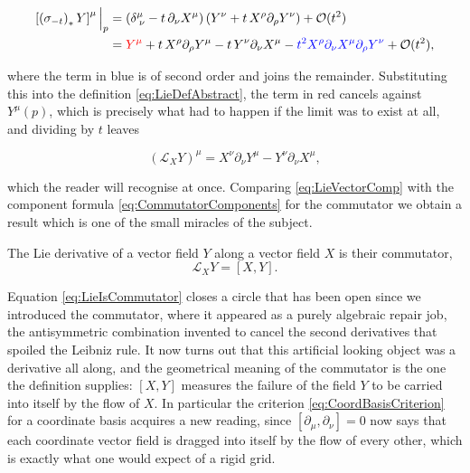         \begin{align*}
            \left[\left(\sigma_{-t}\right)_{*}Y\right]^{\mu}\Big|_p &= \left(\delta^{\mu}_{\;\nu} - t\,\partial_{\nu}X^{\mu}\right)\left(Y^{\nu} + t\,X^{\rho}\partial_{\rho}Y^{\nu}\right) + \mathcal{O}(t^2)\\
            &= {\color{red}Y^{\mu}} + t\,X^{\rho}\partial_{\rho}Y^{\mu} - t\,Y^{\nu}\partial_{\nu}X^{\mu} - {\color{blue}t^2X^{\rho}\partial_{\nu}X^{\mu}\partial_{\rho}Y^{\nu}} + \mathcal{O}(t^2),
        \end{align*}

        where the term in blue is of second order and joins the remainder. Substituting this into the definition \ref{eq:LieDefAbstract}, the term in red cancels against $Y^{\mu}(p)$, which is precisely what had to happen if the limit was to exist at all, and dividing by $t$ leaves

        \begin{equation}\label{eq:LieVectorComp}
            \left(\mathcal{L}_XY\right)^{\mu} = X^{\nu}\partial_{\nu}Y^{\mu} - Y^{\nu}\partial_{\nu}X^{\mu},
        \end{equation}

        which the reader will recognise at once. Comparing \ref{eq:LieVectorComp} with the component formula \ref{eq:CommutatorComponents} for the commutator we obtain a result which is one of the small miracles of the subject.

        \begin{myteo}
            The Lie derivative of a vector field $Y$ along a vector field $X$ is their commutator,
            \begin{equation}\label{eq:LieIsCommutator}
                \mathcal{L}_XY = \left[X,Y\right].
            \end{equation}
        \end{myteo}

        Equation \ref{eq:LieIsCommutator} closes a circle that has been open since we introduced the commutator, where it appeared as a purely algebraic repair job, the antisymmetric combination invented to cancel the second derivatives that spoiled the Leibniz rule. It now turns out that this artificial looking object was a derivative all along, and the geometrical meaning of the commutator is the one the definition supplies: $[X,Y]$ measures the failure of the field $Y$ to be carried into itself by the flow of $X$. In particular the criterion \ref{eq:CoordBasisCriterion} for a coordinate basis acquires a new reading, since $[\partial_{\mu},\partial_{\nu}]=0$ now says that each coordinate vector field is dragged into itself by the flow of every other, which is exactly what one would expect of a rigid grid.

